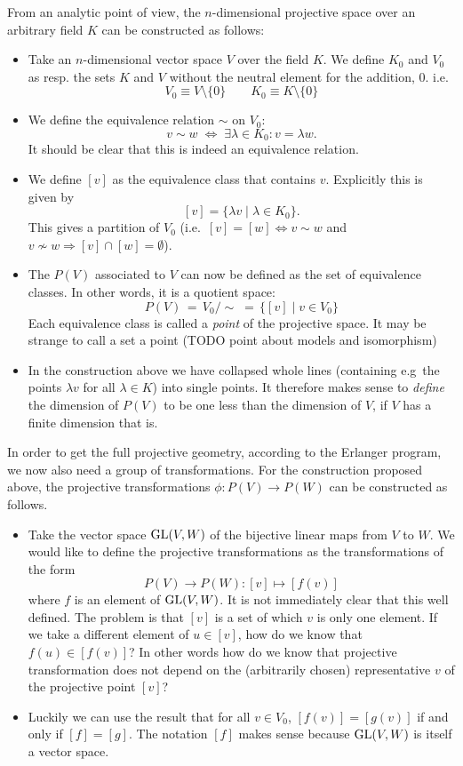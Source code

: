 From an analytic point of view, the $n$-dimensional projective space over an arbitrary field $K$ can be constructed as follows:
\begin{itemize}
\item Take an $n$-dimensional vector space $V$ over the field $K$. We define $K_0$ and $V_0$ as resp. the sets $K$ and $V$ without the neutral element for the addition, $0$. i.e.\
\[ V_0 \equiv V\setminus \{0\} \qquad K_0 \equiv K\setminus \{0\} \]
\item We define the equivalence relation $\sim$ on $V_0$:
\[ v \sim w \;\Leftrightarrow\; \exists \lambda \in K_0: v = \lambda w. \]
It should be clear that this is indeed an equivalence relation.
\item We define $[v]$ as the equivalence class that contains $v$. Explicitly this is given by
\[ [v] = \{ \lambda v \; |\; \lambda \in K_0 \}. \]
This gives a partition of $V_0$ (i.e.\ $[v] = [w] \Leftrightarrow v\sim w$ and $v \nsim w \Rightarrow [v] \cap [w] = \emptyset$).
\item The \udef{projective space} $P(V)$ associated to $V$ can now be defined as the set of equivalence classes. In other words, it is a quotient space:
\[ P(V) \, = \,V_0 / \sim\; =  \,\{ [v] \;|\; v \in V_0 \}  \]
Each equivalence class is called a \textit{point} of the projective space. It may be strange to call a set a point (TODO point about models and isomorphism)
\item In the construction above we have collapsed whole lines (containing e.g\ the points $\lambda v$ for all $\lambda \in K$) into single points. It therefore makes sense to \textit{define} the dimension of $P(V)$ to be one less than the dimension of $V$, if $V$ has a finite dimension that is.
\end{itemize}
In order to get the full projective geometry, according to the Erlanger program, we now also need a group of transformations. For the construction proposed above, the projective transformations $\phi: P(V) \to P(W)$ can be constructed as follows.
\begin{itemize}
\item Take the vector space $\operatorname{GL}(V,W)$ of the bijective linear maps from $V$ to $W$. We would like to define the projective transformations as the transformations of the form
\[ P(V) \to P(W): [v] \mapsto [f(v)] \]
where $f$ is an element of $\operatorname{GL}(V,W)$. It is not immediately clear that this well defined. The problem is that $[v]$ is a set of which $v$ is only one element. If we take a different element of $u \in [v]$, how do we know that $f(u) \in [f(v)]$? In other words how do we know that projective transformation does not depend on the (arbitrarily chosen) representative $v$ of the projective point $[v]$?
\item Luckily we can use the result that for all $v\in V_0$, $[f(v)] = [g(v)]$ if and only if $[f] = [g]$. The notation $[f]$ makes sense because $\operatorname{GL}(V,W)$ is itself a vector space.
\end{itemize}


